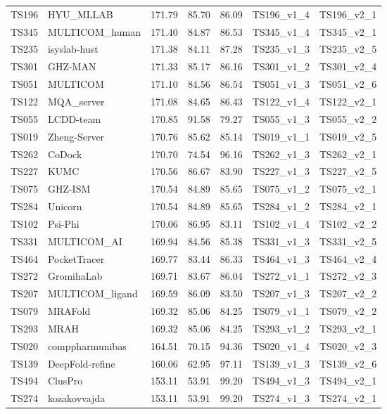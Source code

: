 \begin{table}[ht]
{\begin{tabular}{llrrrll}
TS196 & HYU\_MLLAB & 171.79 & 85.70 & 86.09 & TS196\_v1\_4 & TS196\_v2\_1 \\ 
TS345 & MULTICOM\_human & 171.40 & 84.87 & 86.53 & TS345\_v1\_4 & TS345\_v2\_1 \\ 
TS235 & isyslab-hust & 171.38 & 84.11 & 87.28 & TS235\_v1\_3 & TS235\_v2\_5 \\ 
TS301 & GHZ-MAN & 171.33 & 85.17 & 86.16 & TS301\_v1\_2 & TS301\_v2\_4 \\ 
TS051 & MULTICOM & 171.10 & 84.56 & 86.54 & TS051\_v1\_3 & TS051\_v2\_6 \\ 
TS122 & MQA\_server & 171.08 & 84.65 & 86.43 & TS122\_v1\_4 & TS122\_v2\_1 \\ 
TS055 & LCDD-team & 170.85 & 91.58 & 79.27 & TS055\_v1\_3 & TS055\_v2\_2 \\ 
TS019 & Zheng-Server & 170.76 & 85.62 & 85.14 & TS019\_v1\_1 & TS019\_v2\_5 \\ 
TS262 & CoDock & 170.70 & 74.54 & 96.16 & TS262\_v1\_3 & TS262\_v2\_1 \\ 
TS227 & KUMC & 170.56 & 86.67 & 83.90 & TS227\_v1\_3 & TS227\_v2\_5 \\ 
TS075 & GHZ-ISM & 170.54 & 84.89 & 85.65 & TS075\_v1\_2 & TS075\_v2\_1 \\ 
TS284 & Unicorn & 170.54 & 84.89 & 85.65 & TS284\_v1\_2 & TS284\_v2\_1 \\ 
TS102 & Psi-Phi & 170.06 & 86.95 & 83.11 & TS102\_v1\_4 & TS102\_v2\_2 \\ 
TS331 & MULTICOM\_AI & 169.94 & 84.56 & 85.38 & TS331\_v1\_3 & TS331\_v2\_5 \\ 
TS464 & PocketTracer & 169.77 & 83.44 & 86.33 & TS464\_v1\_3 & TS464\_v2\_4 \\ 
TS272 & GromihaLab & 169.71 & 83.67 & 86.04 & TS272\_v1\_1 & TS272\_v2\_3 \\ 
TS207 & MULTICOM\_ligand & 169.59 & 86.09 & 83.50 & TS207\_v1\_3 & TS207\_v2\_2 \\ 
TS079 & MRAFold & 169.32 & 85.06 & 84.25 & TS079\_v1\_1 & TS079\_v2\_2 \\ 
TS293 & MRAH & 169.32 & 85.06 & 84.25 & TS293\_v1\_2 & TS293\_v2\_1 \\ 
TS020 & comppharmunibas & 164.51 & 70.15 & 94.36 & TS020\_v1\_4 & TS020\_v2\_3 \\ 
TS139 & DeepFold-refine & 160.06 & 62.95 & 97.11 & TS139\_v1\_3 & TS139\_v2\_6 \\ 
TS494 & ClusPro & 153.11 & 53.91 & 99.20 & TS494\_v1\_3 & TS494\_v2\_1 \\ 
TS274 & kozakovvajda & 153.11 & 53.91 & 99.20 & TS274\_v1\_3 & TS274\_v2\_1 \\ 

\end{tabular}}
\end{table}
